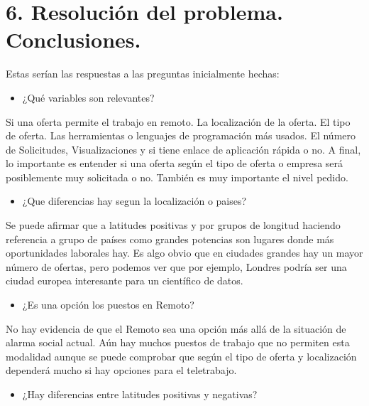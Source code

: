 \documentclass[
]{article}
\providecommand{\tightlist}{%
  \setlength{\itemsep}{0pt}\setlength{\parskip}{0pt}}
\begin{document}
\hypertarget{resoluciuxf3n-del-problema.-conclusiones.}{%
\section{6. Resolución del problema.
Conclusiones.}\label{resoluciuxf3n-del-problema.-conclusiones.}}

Estas serían las respuestas a las preguntas inicialmente hechas:

\begin{itemize}
\tightlist
\item
  ¿Qué variables son relevantes?
\end{itemize}

Si una oferta permite el trabajo en remoto. La localización de la
oferta. El tipo de oferta. Las herramientas o lenguajes de programación
más usados. El número de Solicitudes, Visualizaciones y si tiene enlace
de aplicación rápida o no. A final, lo importante es entender si una
oferta según el tipo de oferta o empresa será posiblemente muy
solicitada o no. También es muy importante el nivel pedido.

\begin{itemize}
\tightlist
\item
  ¿Que diferencias hay segun la localización o paises?
\end{itemize}

Se puede afirmar que a latitudes positivas y por grupos de longitud
haciendo referencia a grupo de países como grandes potencias son lugares
donde más oportunidades laborales hay. Es algo obvio que en ciudades
grandes hay un mayor número de ofertas, pero podemos ver que por
ejemplo, Londres podría ser una ciudad europea interesante para un
científico de datos.

\begin{itemize}
\tightlist
\item
  ¿Es una opción los puestos en Remoto?
\end{itemize}

No hay evidencia de que el Remoto sea una opción más allá de la
situación de alarma social actual. Aún hay muchos puestos de trabajo que
no permiten esta modalidad aunque se puede comprobar que según el tipo
de oferta y localización dependerá mucho si hay opciones para el
teletrabajo.

\begin{itemize}
\tightlist
\item
  ¿Hay diferencias entre latitudes positivas y negativas?
\end{itemize}
\end{document}
